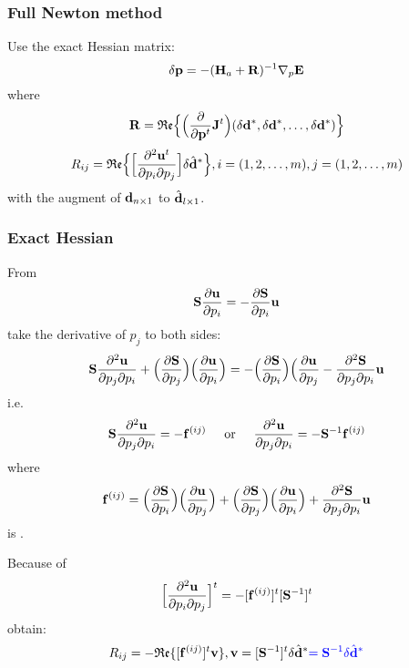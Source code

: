 \subsubsection{Full Newton method}
Use the exact Hessian matrix:
\[ \delta\mathbf{p}=-(\mathbf{H}_a+\mathbf{R})^{-1}\nabla_p\mathbf{E} \]
where
\[ \mathbf{R}=\mathfrak{Re}\Big\{\Big(\frac{\partial}{\partial\mathbf{p}^t}\mathbf{J}^t\Big)(\delta\mathbf{d}^*,\delta\mathbf{d}^*,\ldots,\delta\mathbf{d}^*)\Big\} \]
\[ R_{ij}=\mathfrak{Re}\Big\{\Big[\frac{\partial^2\mathbf{u}^t}{\partial p_i\partial p_j}\Big]\delta\hat{\mathbf{d}}^*\Big\},i=(1,2,\ldots,m),j=(1,2,\ldots,m) \]
with the augment of $\mathbf{d}_{n\times 1}$ to $\hat{\mathbf{d}}_{l\times 1}$.

\subsubsection{Exact Hessian}
From
\[ \mathbf{S}\frac{\partial\mathbf{u}}{\partial p_i}=-\frac{\partial\mathbf{S}}{\partial p_i}\mathbf{u} \]
take the derivative of $p_j$ to both sides:
\[ \mathbf{S}\frac{\partial^2\mathbf{u}}{\partial p_j\partial p_i}+\Big(\frac{\partial\mathbf{S}}{\partial p_j}\Big)\Big(\frac{\partial\mathbf{u}}{\partial p_i}\Big)=-\Big(\frac{\partial\mathbf{S}}{\partial p_i}\Big)\Big(\frac{\partial\mathbf{u}}{\partial p_j}-\frac{\partial^2\mathbf{S}}{\partial p_j\partial p_i}\mathbf{u} \]
i.e.
\[ \mathbf{S}\frac{\partial^2\mathbf{u}}{\partial p_j\partial p_i}=-\mathbf{f}^{(ij)} \text{\hspace{5mm}or\hspace{5mm}} \frac{\partial^2\mathbf{u}}{\partial p_j\partial p_i}=-\mathbf{S}^{-1}\mathbf{f}^{(ij)} \]
where
\[ \mathbf{f}^{(ij)}=\Big(\frac{\partial\mathbf{S}}{\partial p_i}\Big)\Big(\frac{\partial\mathbf{u}}{\partial p_j}\Big)+\Big(\frac{\partial\mathbf{S}}{\partial p_j}\Big)\Big(\frac{\partial\mathbf{u}}{\partial p_i}\Big)+\frac{\partial^2\mathbf{S}}{\partial p_j\partial p_i}\mathbf{u} \]
is .

Because of
\[ \Big[\frac{\partial^2\mathbf{u}}{\partial p_i\partial p_j}\Big]^t=-[\mathbf{f}^{(ij)}]^t[\mathbf{S}^{-1}]^t \]
obtain:
\[ R_{ij}=-\mathfrak{Re}\{[\mathbf{f}^{(ij)}]^t\mathbf{v}\},\mathbf{v}=[\mathbf{S}^{-1}]^t\delta\hat{\mathbf{d}}^*{\color{blue}=\mathbf{S}^{-1}\delta\hat{\mathbf{d}}^*} \]

